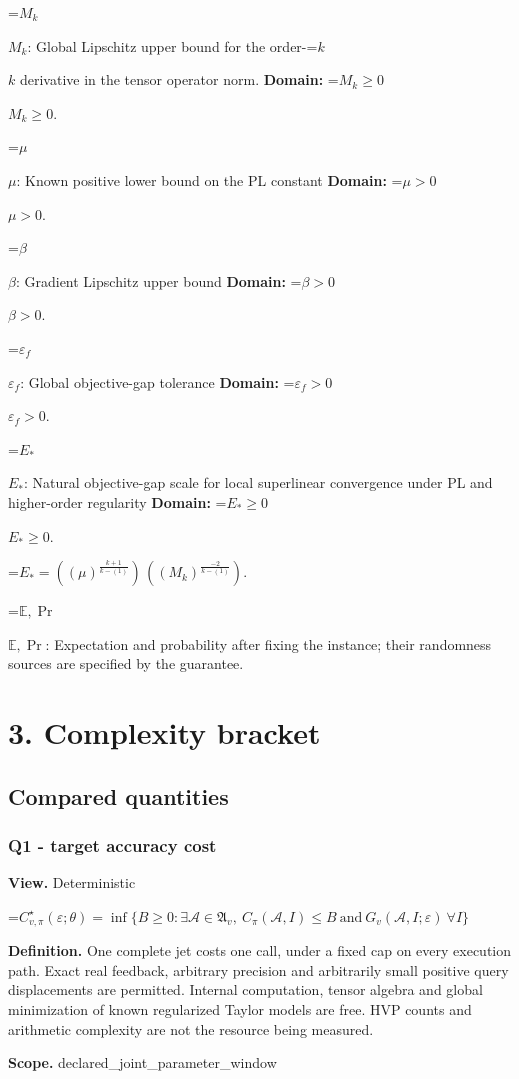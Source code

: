 \documentclass[10pt,a4paper]{article}
\newcommand{\AtlasMath}[1]{\par\begingroup\centering\setbox0=\hbox{$\displaystyle #1$}\ifdim\wd0>1.4\linewidth\typeout{ATLAS WIDE FORMULA: \the\wd0}\fi\ifdim\wd0>\linewidth\resizebox{\linewidth}{!}{\box0}\else\box0\fi\par\endgroup}
\newcommand{\AtlasInlineMath}[1]{\begingroup\setbox0=\hbox{$#1$}\ifdim\wd0>.4\linewidth\endgroup\AtlasMath{#1}\else\endgroup$#1$\fi}
\begin{document}
\AtlasInlineMath{M_k}: Global Lipschitz upper bound for the order-\AtlasInlineMath{k} derivative in the tensor operator norm. \textbf{Domain:} \AtlasInlineMath{M_k\ge0}.

\AtlasInlineMath{\mu}: Known positive lower bound on the PL constant \textbf{Domain:} \AtlasInlineMath{\mu>0}.

\AtlasInlineMath{\beta}: Gradient Lipschitz upper bound \textbf{Domain:} \AtlasInlineMath{\beta>0}.

\AtlasInlineMath{\varepsilon_f}: Global objective-gap tolerance \textbf{Domain:} \AtlasInlineMath{\varepsilon_f>0}.

\AtlasInlineMath{E_*}: Natural objective-gap scale for local superlinear convergence under PL and higher-order regularity \textbf{Domain:} \AtlasInlineMath{E_*\ge0}.


\AtlasMath{E_*=((\mu)^{\frac{k+1}{k-(1)}})\,((M_k)^{\frac{-2}{k-(1)}}).}


\AtlasInlineMath{\mathbb{E},\Pr}: Expectation and probability after fixing the instance; their randomness sources are specified by the guarantee.

\section{3. Complexity bracket}
\subsection{Compared quantities}
\subsubsection{Q1 - target accuracy cost}
\textbf{View.} Deterministic

\AtlasMath{C^\star_{v,\pi}(\varepsilon;\theta)=\inf\{B\ge0:\exists\mathcal A\in\mathfrak A_v,\ C_\pi(\mathcal A,I)\le B\ \text{and}\ G_v(\mathcal A,I;\varepsilon)\ \forall I\}}
\textbf{Definition.} One complete jet costs one call, under a fixed cap on every execution path. Exact real feedback, arbitrary precision and arbitrarily small positive query displacements are permitted. Internal computation, tensor algebra and global minimization of known regularized Taylor models are free. HVP counts and arithmetic complexity are not the resource being measured.

\textbf{Scope.} declared\_joint\_parameter\_window
\end{document}
